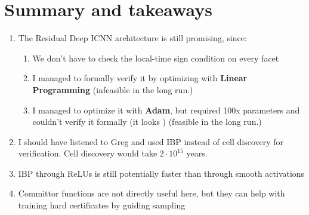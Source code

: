\documentclass[10pt]{extarticle}
\begin{document}
\clearpage

\section{Summary and takeaways}

\begin{enumerate}
  \item The Residual Deep ICNN architecture is still promising, since:
  \begin{enumerate}
    \item We don't have to check the local-time sign condition on every facet 
    \item I managed to formally verify it by optimizing with \textbf{Linear Programming} 
    (infeasible in the long run.)
    \item I managed to optimize it with \textbf{Adam}, but required 100x parameters and 
    couldn't verify it formally (it looks )  (feasible in the long run.)
  \end{enumerate}
  \item I should have listened to Greg and used IBP instead of cell discovery for verification.
  Cell discovery would take $2 \cdot 10^{15}$ years.
  \item IBP through ReLUs is still potentially faster than through smooth activations  
  \item Committor functions are not directly useful here, but they can help with training 
  hard certificates by guiding sampling
\end{enumerate}
\end{document}
